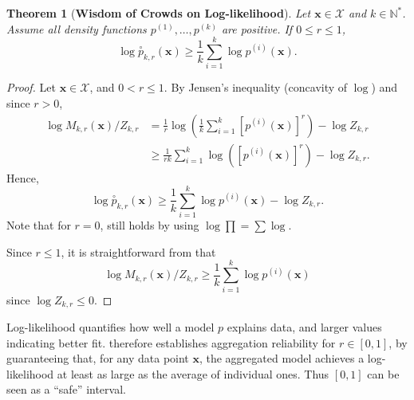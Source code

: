 \documentclass[accepted]{uai2026} %
\newtheorem{theorem}{Theorem}[section]
\newcommand{\N}{\mathbb{N}}
\newcommand{\vx}{\mathbf{x}}
\newcommand{\compose}[1]{\overset{\circ}{#1}}
\begin{document}
\begin{theorem}[\textbf{Wisdom of Crowds on Log-likelihood}]\label{theorem: log-likelihood inequality}
Let $\vx \in \mathcal{X}$ and $k \in \N^*$. Assume all density functions $p^{(1)},\dots,p^{(k)}$ are positive. If $0 \leq r\leq 1$,
\begin{equation}\label{eq: inequality log power mean}
\log \compose{p}_{k,r}(\vx) \geq \frac{1}{k} \sum_{i=1}^k \log p^{(i)}(\vx).
\end{equation}
\end{theorem}
\begin{proof}
Let $\vx \in \mathcal{X}$, and $0 < r \leq 1$. By Jensen’s inequality (concavity of $\log$) and since $r>0$,
\begin{align}
\log M_{k,r}(\vx)/Z_{k,r} & =  \frac{1}{r}\log \left( \frac{1}{k} \sum_{i=1}^k [p^{(i)}(\vx)]^r\right) - \log Z_{k,r} \\
& \geq \frac{1}{rk} \sum_{i=1}^k \log ([p^{(i)}(\vx)]^r) - \log Z_{k,r}. \label{eq: jensen inequality r positive}
\end{align}
Hence,
\begin{equation}\label{eq: final equation proof}
\log \compose{p}_{k,r}(\vx) \geq \frac{1}{k} \sum_{i=1}^k \log p^{(i)}(\vx) - \log Z_{k,r}. 
\end{equation}
Note that for $r=0$,  still holds by using $\log \prod = \sum \log$.

Since $r \leq 1$, it is straightforward from  that
\begin{equation}
\log M_{k,r}(\vx)/Z_{k,r} \geq \frac{1}{k} \sum_{i=1}^k \log p^{(i)}(\vx)
\end{equation}
since $ \log Z_{k,r} \leq 0$.


\end{proof}

Log-likelihood quantifies how well a model $p$ explains data, and larger values indicating better fit.  therefore establishes aggregation reliability for $r \in [0,1]$, by guaranteeing that, for any data point $\vx$, the aggregated model achieves a log-likelihood at least as large as the average of individual ones. Thus $[0,1]$ can be seen as a ``safe'' interval.
\end{document}
